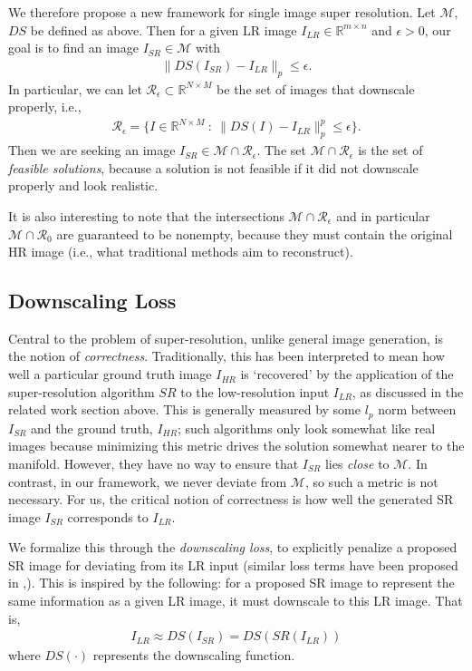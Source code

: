 \documentclass[10pt,twocolumn,letterpaper]{article}
\begin{document}
We therefore propose a new framework for single image super resolution. Let $\mathcal{M}$, $DS$ be defined as above. Then for a given LR image $I_{LR} \in \mathbb{R}^{m \times n}$ and $\epsilon > 0$, our goal is to find an image $I_{SR} \in \mathcal{M}$ with
\begin{align}
\|DS(I_{SR})-I_{LR}\|_p \leq \epsilon.
\end{align} In particular, we can let $\mathcal{R}_\epsilon \subset \mathbb{R}^{N\times M}$ be the set of images that downscale properly, i.e.,
\begin{align}
\mathcal{R}_\epsilon = \{I \in \mathbb{R}^{N\times M} ~:~ \|DS(I)-I_{LR}\|_p^p \leq \epsilon\}.
\end{align} Then we are seeking an image $I_{SR} \in \mathcal{M} \cap \mathcal{R}_\epsilon$. The set $\mathcal{M} \cap \mathcal{R}_\epsilon$ is the set of \textit{feasible solutions}, because a solution is not feasible if it did not downscale properly and look realistic.

It is also interesting to note that the intersections $\mathcal{M} \cap \mathcal{R}_\epsilon$ and in particular $\mathcal{M} \cap \mathcal{R}_0$ are guaranteed to be nonempty, because they must contain the original HR image (i.e., what traditional methods aim to reconstruct).

\subsection{Downscaling Loss}
Central to the problem of super-resolution, unlike general image generation, is the notion of \textit{correctness}. Traditionally, this has been interpreted to mean how well a particular ground truth image $I_{HR}$ is `recovered' by the application of the super-resolution algorithm $SR$ to the low-resolution input $I_{LR}$, as discussed in the related work section above. This is generally measured by some $l_p$ norm between $I_{SR}$ and the ground truth, $I_{HR}$; such algorithms only look somewhat like real images because minimizing this metric drives the solution somewhat nearer to the manifold. However, they have no way to ensure that $I_{SR}$ lies \textit{close} to $\mathcal{M}$. In contrast, in our framework, we never deviate from $\mathcal{M}$, so such a metric is not necessary. For us, the critical notion of correctness is how well the generated SR image $I_{SR}$ corresponds to $I_{LR}$.

We formalize this through the \textit{downscaling loss}, to explicitly penalize a proposed SR image for deviating from its LR input (similar loss terms have been proposed in \cite{styleganembedding},\cite{deep_prior}). This is inspired by the following: for a proposed SR image to represent the same information as a given LR image, it must downscale to this LR image. That is,
\begin{align}
    I_{LR} \approx DS(I_{SR}) = DS(SR(I_{LR}))
\end{align}
where $DS(\cdot)$ represents the downscaling function.
\end{document}

